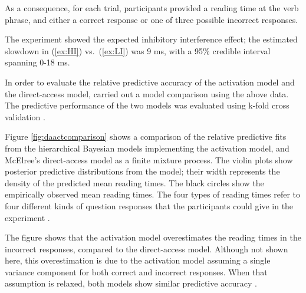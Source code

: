 \documentclass{cambridge7A}\usepackage[]{graphicx}\usepackage[]{color}
\begin{document}
As a consequence, for each trial, participants provided a reading time at the verb phrase, and either a correct response or one of three possible incorrect responses. 

The experiment showed the expected inhibitory interference effect; the estimated slowdown in (\ref{ex:HI}) vs.\ (\ref{ex:LI}) was 9 ms, with a 95\% credible interval spanning 0-18 ms.  

In order to evaluate the relative predictive accuracy of the activation model and the direct-access model, \cite{NicenboimRetrieval2018} carried out a model comparison using the above data. The predictive performance of the two models was evaluated using k-fold cross validation \citep{vehtari2012survey,vehtari2016LOOwaic}.  

Figure \ref{fig:daactcomparison} shows a comparison of the relative predictive fits from the hierarchical Bayesian models implementing the activation model, and McElree's direct-access model as a finite mixture process. The violin plots show posterior predictive distributions from the model; their width represents the density of the predicted mean reading times. The black circles show the empirically observed mean reading times. The four types of reading times refer to four different kinds of question responses that the participants could give in the experiment \citep{nicenboimexploratory}. 

The figure shows that the activation model overestimates the reading times in the incorrect responses, compared to the direct-access model. Although not shown here, this overestimation is due to the activation model assuming a single variance component for both correct and incorrect responses. When that assumption is relaxed, both models show similar predictive accuracy \citep{NicenboimRetrieval2018}.
\end{document}
